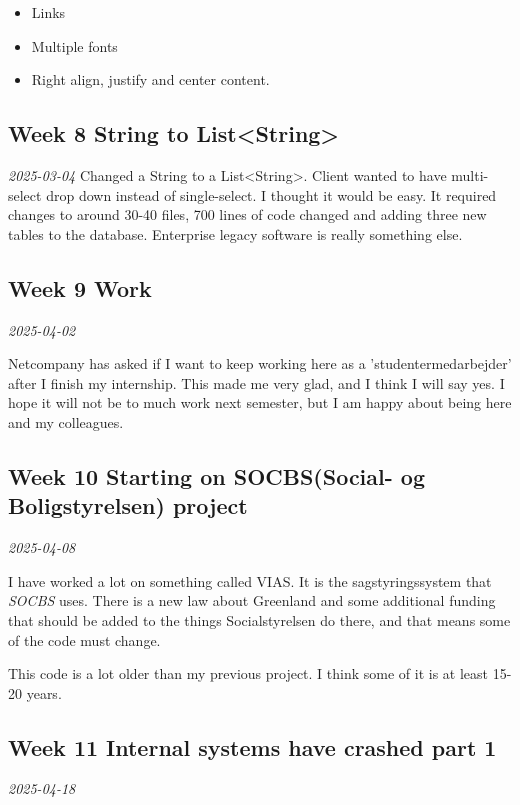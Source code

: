 \documentclass[../main.tex]{subfiles}
\begin{document}
\begin{itemize}
    \item Links
    \item Multiple fonts
    \item Right align, justify and center content.
\end{itemize}


\subsection{Week 8 String to List<String>}
\textit{2025-03-04}
Changed a String to a List<String>. Client wanted to have multi-select drop down instead of single-select. I thought it would be easy. It required changes to around 30-40 files, 700 lines of code changed and adding three new tables to the database. Enterprise legacy software is really something else.

\subsection{Week 9 Work}
\textit{2025-04-02}

Netcompany has asked if I want to keep working here as a
'studentermedarbejder' after I finish my internship. This made me very
glad, and I think I will say yes. I hope it will not be to much work
next semester, but I am happy about being here and my colleagues. \\

\subsection{Week 10 Starting on SOCBS(Social- og Boligstyrelsen) project}

\textit{2025-04-08}

I have worked a lot on something called VIAS. It is the sagstyringssystem that \textit{SOCBS} uses. There is a new law about Greenland and some additional funding that should be added to the things Socialstyrelsen do there, and that means some of the code must change.

This code is a lot older than my previous project. I think some of it is at least 15-20 years. 

\subsection{Week 11 Internal systems have crashed part 1}

\textit{2025-04-18}
\end{document}
